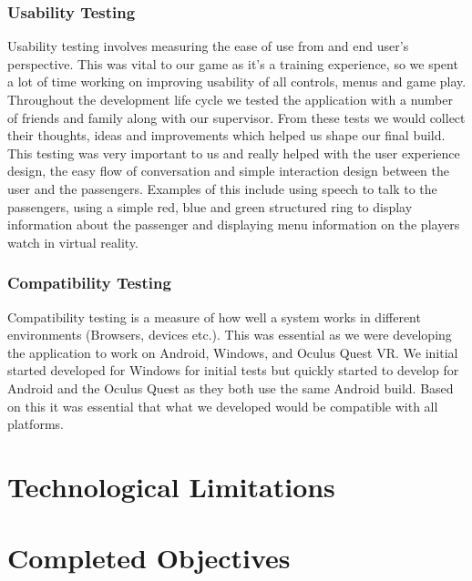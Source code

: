 \subsubsection{Usability Testing}
Usability testing involves measuring the ease of use from and end user’s perspective. This was vital to our game as it's a training experience, so we spent a lot of time working on improving usability of all controls, menus and game play. Throughout the development life cycle we tested the application with a number of friends and family along with our supervisor. From these tests we would collect their thoughts, ideas and improvements which helped us shape our final build. This testing was very important to us and really helped with the user experience design, the easy flow of conversation and simple interaction design between the user and the passengers. Examples of this include using speech to talk to the passengers, using a simple red, blue and green structured ring to display information about the passenger and displaying menu information on the players watch in virtual reality.

\subsubsection{Compatibility Testing}
Compatibility testing is a measure of how well a system works in different environments (Browsers, devices etc.). This was essential as we were developing the application to work on Android, Windows, and Oculus Quest VR. We initial started developed for Windows for initial tests but quickly started to develop for Android and the Oculus Quest as they both use the same Android build. Based on this it was essential that what we developed would be compatible with all platforms.

\section{Technological Limitations}

\section{Completed Objectives}